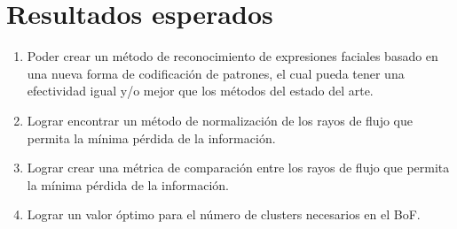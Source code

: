 \documentclass{article}
\begin{document}
\section{Resultados esperados}
\begin{enumerate}
\item Poder crear un método de reconocimiento de expresiones faciales basado en una nueva forma de codificación de patrones, el cual pueda tener una efectividad igual y/o mejor que los métodos del estado del arte.
\item Lograr encontrar un método de normalización de los rayos de flujo que permita la mínima pérdida de la información.
\item Lograr crear una métrica de comparación entre los rayos de flujo que permita la mínima pérdida de la información.
\item Lograr un valor óptimo para el número de clusters necesarios en el BoF.

\end{enumerate}
\nocite{*}


\end{document}
